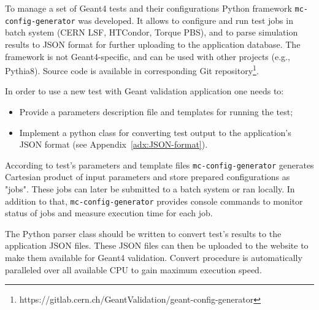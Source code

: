 To manage a set of Geant4 tests and their configurations Python framework {\tt mc-config-generator} was developed. It allows to configure and run test jobs in batch system (CERN LSF, HTCondor, Torque PBS), and to parse simulation results to JSON format for further uploading to the application database.
The framework is not Geant4-specific, and can be used with other projects (e.g., Pythia8). Source code is available in corresponding Git repository\footnote{https://gitlab.cern.ch/GeantValidation/geant-config-generator}.

In order to use a new test with Geant validation application one needs to:

\begin{itemize}
	\item Provide a parameters description file and templates for running the test;
	\item Implement a python class for converting test output to the application's JSON format (see Appendix~\ref{adx:JSON-format}).
\end{itemize}

According to test's parameters and template files {\tt mc-config-generator} generates Cartesian product of input parameters and store prepared configurations as "jobs". These jobs can later be submitted to a batch system or ran locally. In addition to that, {\tt mc-config-generator} provides console commands to monitor status of jobs and measure execution time for each job.

The Python parser class should be written to convert test's results to the application JSON files. These JSON files can then be uploaded to the website to make them available for Geant4 validation. Convert procedure is automatically paralleled over all available CPU to gain maximum execution speed.






